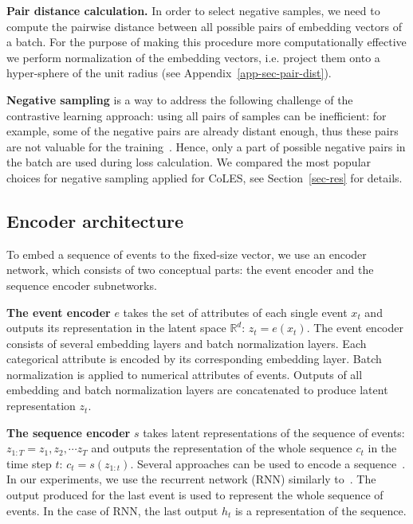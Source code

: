 \documentclass[sigconf]{acmart}
\newcommand{\R}{\mathbb{R}}
\begin{document}
\textbf{Pair distance calculation.} In order to select negative samples, we need to compute the pairwise distance between all possible pairs of embedding vectors of a batch. For the purpose of making this procedure more computationally effective we perform normalization of the embedding vectors, i.e. project them onto a hyper-sphere of the unit radius (see Appendix~\ref{app-sec-pair-dist}).


\textbf{Negative sampling} is a way to address the following challenge of the contrastive learning approach: using all pairs of samples can be inefficient: for example, some of the negative pairs are already distant enough, thus these pairs are not valuable for the training~\citep{SimoSerra2015DiscriminativeLO, Schroff2015FaceNetAU}. Hence, only a part of possible negative pairs in the batch are used during loss calculation. We compared the most popular choices for negative sampling applied for CoLES, see Section~\ref{sec-res} for details.

\subsection{Encoder architecture} \label{sec-enc-arch}

To embed a sequence of events to the fixed-size vector, we use an encoder network, which consists of two conceptual parts: the event encoder and the sequence encoder subnetworks.

\textbf{The event encoder} $e$ takes the set of attributes of each single event $x_t$ and outputs its representation in the latent space $\R^d$: $z_t = e(x_t)$. The event encoder consists of several embedding layers and batch normalization layers. Each categorical attribute is encoded by its corresponding embedding layer. Batch normalization is applied to numerical attributes of events. Outputs of all embedding and batch normalization layers are concatenated to produce latent representation $z_t$.

\textbf{The sequence encoder} $s$ takes latent representations of the sequence of events: $ z_{1:T} = z_1, z_2, \cdots z_T $ and outputs the representation of the whole sequence $c_t$ in the time step $t$: $ c_t = s(z_{1:t}) $. Several approaches can be used to encode a sequence~\citep{Cho2014LearningPR, Vaswani2017AttentionIA}. In our experiments, we use the recurrent network (RNN) similarly to~\citep{Sutskever2014SequenceTS}. The output produced for the last event is used to represent the whole sequence of events. In the case of RNN, the last output $h_t$ is a representation of the sequence.
\end{document}
